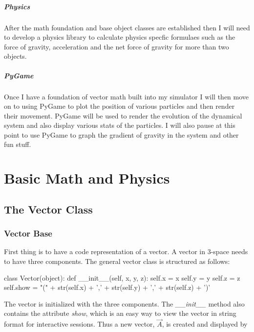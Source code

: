 \documentclass[15pt]{report}
\begin{document}
\indent \paragraph{Physics} After the math foundation and base object classes are established then I will need to develop a physics library to calculate physics specfic formulaes such as the force of gravity, acceleration and the net force of gravity for more than two objects.
\indent \paragraph{PyGame} Once I have a foundation of vector math built into my simulator I will then move on to using PyGame to plot the position of various particles and then render their movement. PyGame will be used to render the evolution of the dynamical system and also display various stats of the particles. I will also pause at this point to use PyGame to graph the gradient of gravity in the system and other fun stuff.



\chapter{Basic Math and Physics}

\section{The Vector Class} \label{vectors}
\subsection{Vector Base} First thing is to have a code representation of a vector. A vector in 3-space needs to have three components. The general vector class is structured as follows:

\begin{code}

class Vector(object):
    def __init__(self, x, y, z):
        self.x = x
        self.y = y
        self.z = z
        self.show = "(" + str(self.x) + ',' + str(self.y) + ',' + str(self.z) + ')'
           

\end{code}

The vector is initialized with the three components. The \textit{\_\_init\_\_} method also contains the attribute \textit{show}, which is an easy way to view the vector in string format for interactive sessions. Thus a new vector, $\vec{A}$, is created and displayed by
\end{document}
